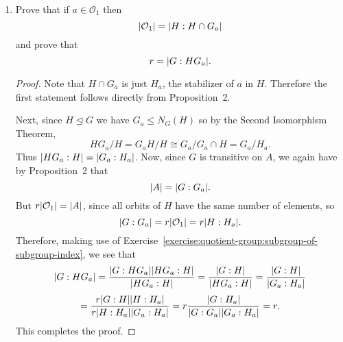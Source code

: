 \begin{enumerate}
\begin{proof}
    Finally, since $G$ is transitive on the orbits of $H$, there is
    $g\in G$ such that $g\mathcal{O}_i = \mathcal{O}_j$. Then the map
    $\varphi\colon\mathcal{O}_i\to\mathcal{O}_j$ given by
    \begin{equation*}
      \varphi(a) = g\cdot a
    \end{equation*}
    is a bijection, since it admits the inverse
    \begin{equation*}
      \varphi^{-1}(b) = g^{-1}\cdot b.
    \end{equation*}
    Therefore all orbits of $H$ have the same cardinality.
  \end{proof}

\item Prove that if $a\in\mathcal{O}_1$ then
  \begin{equation*}
    \lvert{\mathcal{O}_1}\rvert = \lvert{H : H\cap G_a}\rvert
  \end{equation*}
  and prove that
  \begin{equation*}
    r = \lvert{G : HG_a}\rvert.
  \end{equation*}
  \begin{proof}
    Note that $H\cap G_a$ is just $H_a$, the stabilizer of $a$ in
    $H$. Therefore the first statement follows directly from
    Proposition~2.

    Next, since $H\trianglelefteq G$ we have $G_a\leq N_G(H)$ so by
    the Second Isomorphism Theorem,
    \begin{equation*}
      HG_a/H = G_aH/H \cong G_a/G_a\cap H = G_a/H_a.
    \end{equation*}
    Thus $\lvert{HG_a : H}\rvert = \lvert{G_a : H_a}\rvert$. Now, since $G$ is
    transitive on $A$, we again have by Proposition~2 that
    \begin{equation*}
      \lvert{A}\rvert = \lvert{G : G_a}\rvert.
    \end{equation*}
    But $r\lvert{\mathcal{O}_1}\rvert = \lvert{A}\rvert$, since all orbits of $H$ have
    the same number of elements, so
    \begin{equation*}
      \lvert{G : G_a}\rvert = r\lvert{\mathcal{O}_1}\rvert = r\lvert{H : H_a}\rvert.
    \end{equation*}
    Therefore, making use of
    Exercise~\ref{exercise:quotient-group:subgroup-of-subgroup-index},
    we see that
    \begin{multline*}
      \lvert{G : HG_a}\rvert
      = \frac{\lvert{G : HG_a}\rvert\lvert{HG_a : H}\rvert}{\lvert{HG_a : H}\rvert}
      = \frac{\lvert{G : H}\rvert}{\lvert{HG_a : H}\rvert}
      = \frac{\lvert{G : H}\rvert}{\lvert{G_a : H_a}\rvert} \\[3pt]
      = \frac{r\lvert{G : H}\rvert\lvert{H : H_a}\rvert}{r\lvert{H : H_a}\rvert\lvert{G_a : H_a}\rvert}
      = r\frac{\lvert{G : H_a}\rvert}{\lvert{G : G_a}\rvert\lvert{G_a : H_a}\rvert}
      = r.
    \end{multline*}
    This completes the proof.
  \end{proof}
\end{enumerate}

